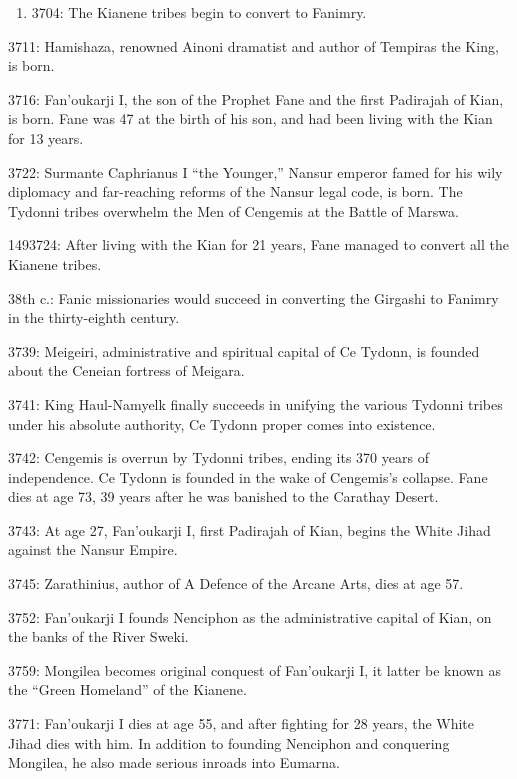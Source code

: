 \documentclass[]{book}
\providecommand{\tightlist}{%
  \setlength{\itemsep}{0pt}\setlength{\parskip}{0pt}}
\begin{document}
\begin{enumerate}
\def\labelenumi{\alph{enumi}.}
\setcounter{enumi}{2}
\tightlist
\item
  3704: The Kianene tribes begin to convert to Fanimry.
\end{enumerate}

3711: Hamishaza, renowned Ainoni dramatist and author of Tempiras the King, is born.

3716: Fan'oukarji I, the son of the Prophet Fane and the first Padirajah of Kian, is
born. Fane was 47 at the birth of his son, and had been living with the Kian for
13 years.

3722: Surmante Caphrianus I ``the Younger,'' Nansur emperor famed for his wily
diplomacy and far-reaching reforms of the Nansur legal code, is born. The Tydonni tribes overwhelm the Men of Cengemis at the Battle of Marswa.

1493724: After living with the Kian for 21 years, Fane managed to convert all the Kianene
tribes.

38th c.: Fanic missionaries would succeed in converting the Girgashi to Fanimry in
the thirty-eighth century.

3739: Meigeiri, administrative and spiritual capital of Ce Tydonn, is founded about
the Ceneian fortress of Meigara.

3741: King Haul-Namyelk finally succeeds in unifying the various Tydonni tribes
under his absolute authority, Ce Tydonn proper comes into existence.

3742: Cengemis is overrun by Tydonni tribes, ending its 370 years of independence.
Ce Tydonn is founded in the wake of Cengemis's collapse. Fane dies at age 73,
39 years after he was banished to the Carathay Desert.

3743: At age 27, Fan'oukarji I, first Padirajah of Kian, begins the White Jihad against
the Nansur Empire.

3745: Zarathinius, author of A Defence of the Arcane Arts, dies at age 57.

3752: Fan'oukarji I founds Nenciphon as the administrative capital of Kian, on the
banks of the River Sweki.

3759: Mongilea becomes original conquest of Fan'oukarji I, it latter be known as the
``Green Homeland'' of the Kianene.

3771: Fan'oukarji I dies at age 55, and after fighting for 28 years, the White Jihad dies
with him. In addition to founding Nenciphon and conquering Mongilea, he also made serious inroads into Eumarna.
\end{document}
